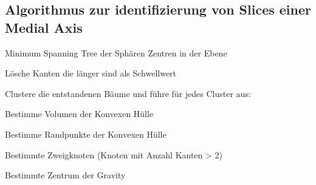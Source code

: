\subsection{Algorithmus zur identifizierung von Slices einer Medial Axis}
\begin{compactenum}
    \item Minimum Spanning Tree der Sphären Zentren in der Ebene
    \item Lösche Kanten die länger sind als Schwellwert
    \item Clustere die entstandenen Bäume und führe für jedes Cluster aus:
    \begin{compactitem}
        \item Bestimme Volumen der Konvexen Hülle
        \item Bestimme Randpunkte der Konvexen Hülle
        \item Bestimmte Zweigknoten (Knoten mit Anzahl Kanten > 2)
        \item Bestimmte Zentrum der Gravity
    \end{compactitem}
\end{compactenum}
